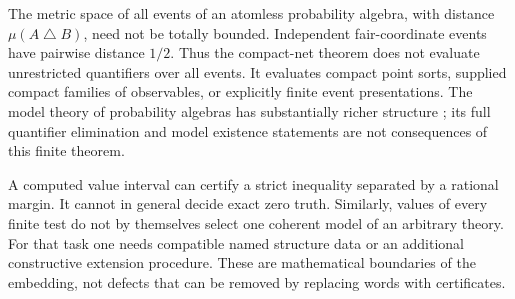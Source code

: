 The metric space of all events of an atomless probability algebra,
with distance $\mu(A\mathbin\triangle B)$, need not be totally bounded.
Independent fair-coordinate events have pairwise distance $1/2$.
Thus the compact-net theorem does not evaluate unrestricted quantifiers
over all events. It evaluates compact point sorts, supplied compact
families of observables, or explicitly finite event presentations.
The model theory of probability algebras has substantially richer
structure \cite{berenstein-henson}; its full quantifier elimination and
model existence statements are not consequences of this finite theorem.

A computed value interval can certify a strict inequality separated by
a rational margin. It cannot in general decide exact zero truth.
Similarly, values of every finite test do not by themselves select one
coherent model of an arbitrary theory. For that task one needs compatible
named structure data or an additional constructive extension procedure.
These are mathematical boundaries of the embedding, not defects that can
be removed by replacing words with certificates.
